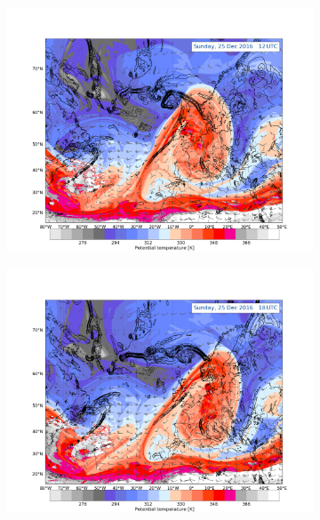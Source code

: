 \begin{figure}\ContinuedFloat
	\centering
	\begin{subfigure}[b]{0.49\textwidth}
		\includegraphics[trim={4.2cm 0cm 4.3cm 5.1cm},clip,
		width=\textwidth]{./fig_DynTropo/20161225_12}
		\caption{} \label{fig:DT25}
	\end{subfigure}
	\begin{subfigure}[b]{0.49\textwidth}
		\includegraphics[trim={4.2cm 0cm 4.3cm 5.1cm},clip,
		width=\textwidth]{./fig_DynTropo/20161225_18}
		\caption{} \label{fig:DT25_18}
	\end{subfigure}

\end{figure}
